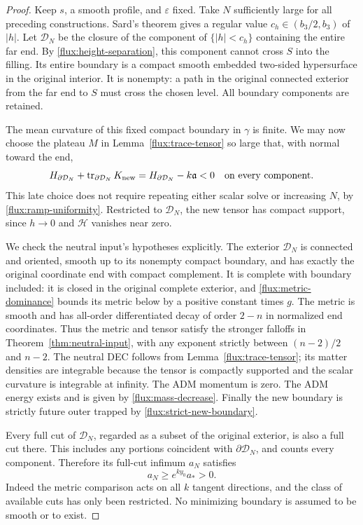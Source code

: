\begin{proof}
Keep $s$, a smooth profile, and $\varepsilon$ fixed.  Take $N$ sufficiently
large for all preceding constructions.  Sard's theorem gives a regular
value $c_h\in(b_3/2,b_3)$ of $|h|$.  Let $\mathcal D_N$ be the closure of
the component of $\{|h|<c_h\}$ containing the entire far end.
By \eqref{flux:height-separation}, this component cannot cross $S$ into the
filling.  Its entire boundary is a compact smooth embedded two-sided
hypersurface in the original interior.  It is nonempty: a path in the
original connected exterior from the far end to $S$ must cross the chosen
level.  All boundary components are retained.

The mean curvature of this fixed compact boundary in $\gamma$ is finite.
We may now choose the plateau $M$ in Lemma~\ref{flux:trace-tensor} so large
that, with normal toward the end,
\begin{equation}
 H_{\partial\mathcal D_N}
       +\operatorname{tr}_{\partial\mathcal D_N}K_{\mathrm{new}}
 =H_{\partial\mathcal D_N}-k\mathfrak a<0
 \quad\hbox{on every component}.
 \label{flux:strict-new-boundary}
\end{equation}
This late choice does not require repeating either scalar solve or
increasing $N$, by \eqref{flux:ramp-uniformity}.  Restricted to
$\mathcal D_N$, the new tensor has compact support, since $h\to0$ and
$\mathcal H$ vanishes near zero.

We check the neutral input's hypotheses explicitly.  The exterior
$\mathcal D_N$ is connected and oriented, smooth up to its nonempty compact
boundary, and has exactly the original coordinate end with compact
complement.  It is complete with boundary included: it is closed in the
original complete exterior, and \eqref{flux:metric-dominance} bounds its
metric below by a positive constant times $g$.  The metric is smooth and
has all-order differentiated decay of order $2-n$ in normalized end
coordinates.  Thus the metric and tensor satisfy the stronger falloffs in
Theorem~\ref{thm:neutral-input}, with any exponent strictly between
$(n-2)/2$ and $n-2$.  The neutral DEC follows from
Lemma~\ref{flux:trace-tensor}; its matter densities are integrable because
the tensor is compactly supported and the scalar curvature is integrable
at infinity.  The ADM momentum is zero.  The ADM energy exists and is
given by \eqref{flux:mass-decrease}.  Finally the new boundary is strictly
future outer trapped by \eqref{flux:strict-new-boundary}.

Every full cut of $\mathcal D_N$, regarded as a subset of the original
exterior, is also a full cut there.  This includes any portions coincident
with $\partial\mathcal D_N$, and counts every component.  Therefore its
full-cut infimum $a_N$ satisfies
\begin{equation}
 a_N\geq e^{ky_0}a_*>0.
 \label{flux:area-retention}
\end{equation}
Indeed the metric comparison acts on all $k$ tangent directions, and the
class of available cuts has only been restricted.  No minimizing boundary
is assumed to be smooth or to exist.


\end{proof}
